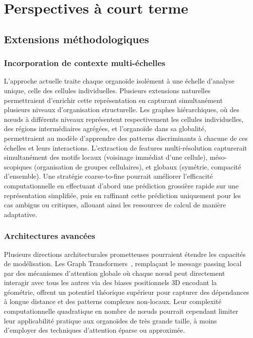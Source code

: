 \section{Perspectives à court terme}

\subsection{Extensions méthodologiques}

\subsubsection{Incorporation de contexte multi-échelles}

L'approche actuelle traite chaque organoïde isolément à une échelle d'analyse unique, celle des cellules individuelles. Plusieurs extensions naturelles permettraient d'enrichir cette représentation en capturant simultanément plusieurs niveaux d'organisation structurelle. Les graphes hiérarchiques, où des nœuds à différents niveaux représentent respectivement les cellules individuelles, des régions intermédiaires agrégées, et l'organoïde dans sa globalité, permettraient au modèle d'apprendre des patterns discriminants à chacune de ces échelles et leurs interactions. L'extraction de features multi-résolution capturerait simultanément des motifs locaux (voisinage immédiat d'une cellule), méso-scopiques (organisation de groupes cellulaires), et globaux (symétrie, compacité d'ensemble). Une stratégie coarse-to-fine pourrait améliorer l'efficacité computationnelle en effectuant d'abord une prédiction grossière rapide sur une représentation simplifiée, puis en raffinant cette prédiction uniquement pour les cas ambigus ou critiques, allouant ainsi les ressources de calcul de manière adaptative.

\subsubsection{Architectures avancées}

Plusieurs directions architecturales prometteuses pourraient étendre les capacités de modélisation. Les Graph Transformers~\cite{Vaswani2017}, remplaçant le message passing local par des mécanismes d'attention globale où chaque nœud peut directement interagir avec tous les autres via des biases positionnels 3D encodant la géométrie, offrent un potentiel théorique supérieur pour capturer des dépendances à longue distance et des patterns complexes non-locaux. Leur complexité computationnelle quadratique en nombre de nœuds pourrait cependant limiter leur applicabilité pratique aux organoïdes de très grande taille, à moins d'employer des techniques d'attention éparse ou approximée.

